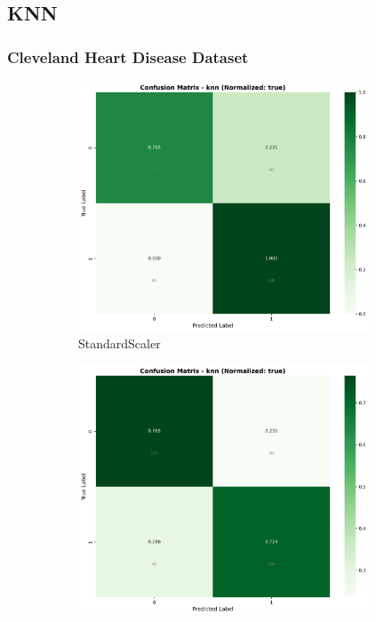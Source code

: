 \FloatBarrier

\subsection{KNN}\label{subsec:knn}

\subsubsection{Cleveland Heart Disease Dataset}\label{subsubsec:knn-cleveland}

\begin{figure}[H]\centering
\begin{subfigure}[b]{0.31\textwidth}\centering
\includegraphics[width=0.95\textwidth]{Result/cleveland_dataset/confusion_matrices/knn_numeric_dataset_StandardScaler.png}
\caption{StandardScaler}\label{fig:knn_clev_cm_standard}
\end{subfigure}\hfill
\begin{subfigure}[b]{0.31\textwidth}\centering
\includegraphics[width=0.95\textwidth]{Result/cleveland_dataset/confusion_matrices/knn_numeric_dataset_MinMaxScaler.png}

\end{subfigure}
\end{figure}
